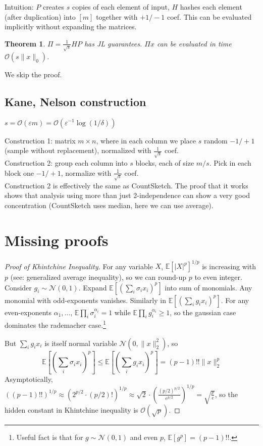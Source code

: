 \documentclass[11pt]{article}
\newtheorem{theorem}{Theorem}
\newcommand{\E}{{\mathbb E}}
\newcommand{\eps}{\varepsilon}
\newcommand{\bigo}{\mathcal{O}}
\begin{document}
Intuition:
$P$ creates $s$ copies of each element of input, $H$ hashes each element (after duplication) into $[m]$ together with $+1/-1$ coef. This can be evaluated implicitly without expanding the matrices.


\begin{theorem}
$\Pi = \frac{1}{\sqrt{s}}HP$ has JL guarantees. $\Pi x$ can be evaluated in time $\bigo(s \|x\|_0)$.
\end{theorem}
We skip the proof.

\subsection{Kane, Nelson construction}
$s = \bigo(\eps m) = \bigo(\varepsilon^{-1} \log(1/\delta))$

Construction 1: matrix $m \times n$, where in each column we place $s$ random $-1/+1$ (sample without replacement), normalized with $\frac{1}{\sqrt{s}}$ coef.\\
Construction 2: group each column into $s$ blocks, each of size $m/s$. Pick in each block one $-1/+1$, normalize with $\frac{1}{\sqrt{s}}$ coef.\\

Construction 2 is effectively the same as \textsf{CountSketch}. The proof that it works shows that analysis using more than just 2-independence can show a very good concentration (CountSketch uses median, here we can use average).


\section{Missing proofs}
\begin{proof}[Proof of Khintchine Inequality]
For any variable $X$, $\E[|X|^p]^{1/p}$ is increasing with $p$ (see: generalized average inequality), so we can round-up $p$ to even integer. Consider $g_i \sim \mathcal{N}(0,1)$.
Expand $\E[ (\sum_i \sigma_i x_i)^p]$ into sum of monomials. Any monomial with odd-exponents vanishes. Similarly in $\E[ (\sum_i g_i x_i)^p ]$. For any even-exponents $\alpha_1,\ldots$, $\E \prod_i \sigma_i^{\alpha_i} = 1$ while $\E \prod_i g_i^{\alpha_i} \ge 1$, so the gaussian case dominates the rademacher case.\footnote{Useful fact is that for $g \sim \mathcal{N}(0,1)$ and even $p$, $\E[g^p] = (p-1)!!$.}

But $\sum_i g_i x_i$ is itself normal variable $\mathcal{N}(0,\|x\|_2^2)$, so
$$\E[ (\sum_i \sigma_i x_i)^p ] \le \E[ (\sum_i g_i x_i)^p ] =  (p-1)!! \|x\|_2^p$$
Asymptotically, $((p-1)!!)^{1/p} \approx (2^{p/2} \cdot (p/2)!)^{1/p} \approx \sqrt{2} \cdot \left(\frac{(p/2)^{p/2}}{e^{p/2}} \right)^{1/p} = \sqrt{\frac{p}{e}}$, so the hidden constant in Khintchine inequality is $\bigo(\sqrt{p})$.

\end{proof}
\end{document}
